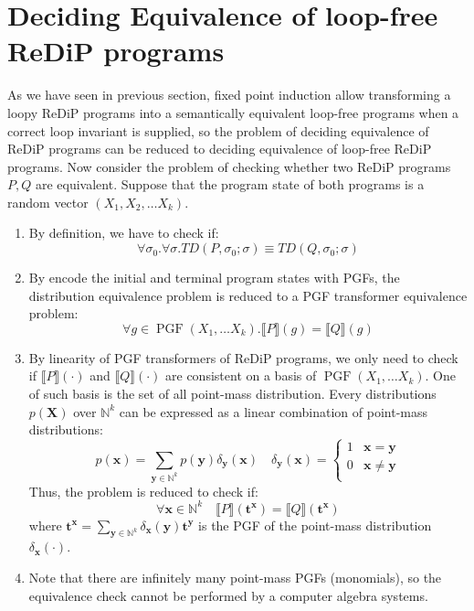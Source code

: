 \documentclass[a4paper]{article}
\DeclareMathOperator*{\PGF}{PGF}
\renewcommand{\S}[1]{ \llbracket #1 \rrbracket }
\begin{document}
\section{Deciding Equivalence of loop-free ReDiP programs}

As we have seen in previous section, fixed point induction allow transforming a loopy ReDiP programs into a semantically equivalent loop-free programs when a correct loop invariant is supplied,
so the problem of deciding equivalence of ReDiP programs can be reduced to deciding equivalence of loop-free ReDiP programs.
Now consider the problem of checking whether two ReDiP programs \(P,Q\) are equivalent. Suppose that the program state of both programs is a random vector \((X_1,X_2,\ldots X_k)\).
\begin{enumerate}
	\item By definition, we have to check if:
	      \[
		      \forall \sigma_0 . \forall \sigma . TD(P,\sigma_0; \sigma)\equiv TD(Q,\sigma_0;\sigma)
	      \]
	\item By encode the initial and terminal program states with PGFs,
	      the distribution equivalence problem is reduced to a PGF transformer equivalence problem:
	      \[
		      \forall g\in \PGF(X_1,\ldots X_k) . \S{P}(g) = \S{Q}(g)
	      \]
	\item By linearity of PGF transformers of ReDiP programs, we only need to check if \(\S{P}(\cdot)\) and \(\S{Q}(\cdot)\) are consistent on a basis of \(\PGF(X_1,\ldots X_k)\).
	      One of such basis is the set of all point-mass distribution.
	      Every distributions \(p(\mathbf{X})\) over \(\mathbb{N}^k\) can be expressed as a linear combination of point-mass distributions:
	      \[
		      p(\mathbf{x}) = \sum_{\mathbf{y}\in\mathbb{N}^k} p(\mathbf{y}) \delta_{\mathbf{y}}(\mathbf{x})
		      \quad
		      \delta_{\mathbf{y}}(\mathbf{x}) = \begin{cases}
			      1 & \mathbf{x} = \mathbf{y}    \\
			      0 & \mathbf{x} \neq \mathbf{y} \\
		      \end{cases}
	      \]
	      Thus, the problem is reduced to check if:
	      \[
		      \forall \mathbf{x} \in \mathbb{N}^k \quad \S{P}(\mathbf{t}^{\mathbf{x}}) = \S{Q}(\mathbf{t}^{\mathbf{x}})
	      \]
	      where \(\mathbf{t}^{\mathbf{x}} = \sum_{\mathbf{y}\in\mathbb{N}^k} \delta_{\mathbf{x}}(\mathbf{y}) \mathbf{t}^{\mathbf{y}}\) is the PGF of the point-mass distribution \(\delta_{\mathbf{x}}(\cdot)\).
	\item Note that there are infinitely many point-mass PGFs (monomials), so the equivalence check cannot be performed by a computer algebra systems.

\end{enumerate}
\end{document}
